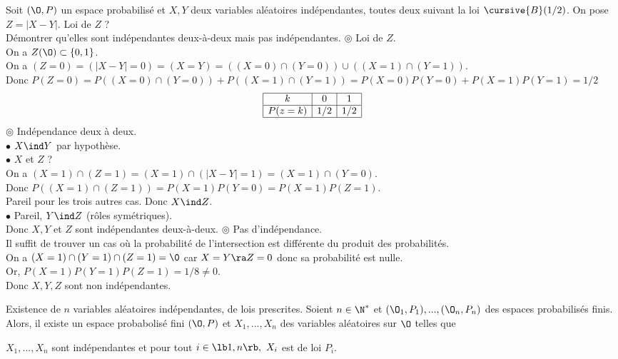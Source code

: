 \documentclass[11pt]{article}
\begin{document}
\begin{ex}{}{}
    Soit $(\O,P)$ un espace probabilisé et $X,Y$ deux variables aléatoires indépendantes, toutes deux suivant la loi $\cursive{B}(1/2)$. On pose $Z=|X-Y|$. Loi de $Z$ ?\\
    Démontrer qu'elles sont indépendantes deux-à-deux mais pas indépendantes.
    \tcblower
    $\circledcirc$ Loi de $Z$.\\
    On a $Z(\O)\subset\{0,1\}$.\\
    On a $(Z=0)=(|X-Y|=0)=(X=Y)=((X=0)\cap(Y=0))\cup((X=1)\cap(Y=1))$.\\
    Donc $P(Z=0)=P((X=0)\cap(Y=0))+P((X=1)\cap(Y=1))=P(X=0)P(Y=0)+P(X=1)P(Y=1)=1/2$
    \begin{eqnarray*}
        \begin{array}{|c|c|c|}
            \hline
            k&0&1\\
            \hline
            P(z=k)&1/2&1/2\\
            \hline
        \end{array}
    \end{eqnarray*}
    $\circledcirc$ Indépendance deux à deux.\\
    $\bullet$ $X\ind Y$ par hypothèse.\\
    $\bullet$ $X$ et $Z$ ?\\
    On a $(X=1)\cap(Z=1)=(X=1)\cap(|X-Y|=1)=(X=1)\cap(Y=0)$.\\
    Donc $P((X=1)\cap(Z=1))=P(X=1)P(Y=0)=P(X=1)P(Z=1)$.\\
    Pareil pour les trois autres cas. Donc $X \ind Z$.\\
    $\bullet$ Pareil, $Y \ind Z$ (rôles symétriques).\\
    Donc $X,Y$ et $Z$ sont indépendantes deux-à-deux.\n
    $\circledcirc$ Pas d'indépendance.\\
    Il suffit de trouver un cas où la probabilité de l'intersection est différente du produit des probabilités.\\
    On a $(X=1)\cap(Y=1)\cap(Z=1)=\0$ car $X=Y\ra Z=0$ donc sa probabilité est nulle.\\
    Or, $P(X=1)P(Y=1)P(Z=1)=1/8\neq0$.\\
    Donc $X,Y,Z$ sont non indépendantes. 
\end{ex}

\begin{thm}{Existence de $n$ variables aléatoires indépendantes, de lois prescrites.}{}
    Soient $n\in\N^*$ et $(\O_1,P_1),...,(\O_n,P_n)$ des espaces probabilisés finis. Alors, il existe un espace probabolisé fini $(\O,P)$ et $X_1,...,X_n$ des variables aléatoires sur $\O$ telles que
    \begin{center}
        $X_1,...,X_n$ sont indépendantes \hspace{0.25cm} et \hspace{0.25cm} pour tout $i\in\lb1,n\rb, ~ X_i$ est de loi $P_i$.
    \end{center}
\end{thm}
\end{document}
